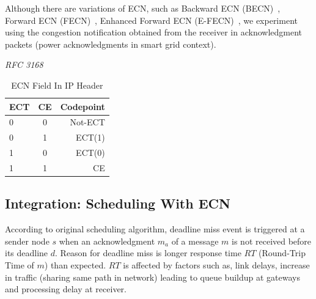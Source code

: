 	Although there are variations of ECN, such as Backward ECN (BECN)~\cite{Davidebecn, Davidebecnv2}, Forward ECN (FECN)~\cite{jiangfecn}, 
Enhanced Forward ECN (E-FECN)~\cite{jiangefecn}, we experiment using the congestion notification obtained from the receiver in acknowledgment 
packets (power acknowledgments in smart grid context).
	
\begin{table}
\begin{center}
\textit{RFC 3168}   
  \begin{tabular}{| l | c || r |}
   	\hline
   	ECT & CE & Codepoint \\ \hline
   	0 & 0 & Not-ECT \\
   	0 & 1 & ECT(1) \\
   	1 & 0 & ECT(0) \\
   	1 & 1 & CE \\
   	\hline
 \end{tabular}
    \caption{ECN Field In IP Header}
    \label{tab:ecn_bits}
\end{center}  
\end{table}	
		
\subsection{Integration: Scheduling With ECN}
\label{sec:sched_ecn_integration} 

	According to original scheduling algorithm, deadline miss event is triggered at a sender node $s$ when an acknowledgment $m_a$ of a message $m$ is not received before its deadline $d$. Reason for deadline miss is longer response time $RT$ (Round-Trip Time of $m$) than expected. $RT$ is affected by factors such as, link delays, increase in traffic (sharing same path in network) leading to queue buildup at gateways and processing delay at receiver. 


